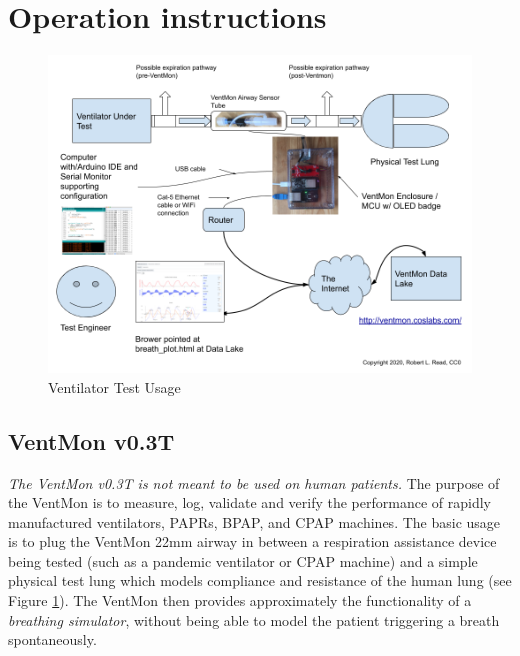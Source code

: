 \documentclass[11pt, letterpaper]{article}
\begin{document}

\section{Operation instructions}

\begin{figure}[H]
\centering
\includegraphics[width=\textwidth]{images/VentMonOverallArchitecture.png}
\caption{Ventilator Test Usage}
\label{fig:vtestusage}
\end{figure}


\subsection{VentMon v0.3T}

{\em The VentMon v0.3T is not meant to be used on human patients. }
The purpose of the VentMon is to measure, log, validate and verify the performance of rapidly manufactured ventilators, PAPRs, BPAP, and CPAP machines. The basic usage is to plug the VentMon 22mm airway in between a respiration assistance device being tested (such as a pandemic ventilator or CPAP machine) and a simple physical test lung which models compliance and resistance of the human lung (see Figure \ref{fig:vtestusage}). The VentMon then provides approximately the functionality of a {\em breathing simulator}, without being able to model the patient triggering a breath spontaneously.
\end{document}
